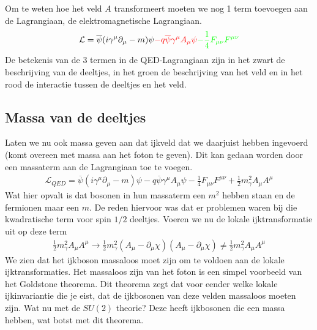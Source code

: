 \documentclass[../main.tex]{subfiles}
\begin{document}
Om te weten hoe het veld $A$ transformeert moeten we nog 1 term toevoegen aan de Lagrangiaan, de elektromagnetische Lagrangiaan.
\begin{equation}
    \begin{aligned}
        \label{eq:lok_ijk_inv_qed}
        \mathcal{L} = \overline \psi (i\gamma^\mu \partial_\mu - m)\psi {\color{red}- q\overline\psi\gamma^\mu A_\mu\psi} {\color{green}- \frac{1}{4} F_{\mu\nu}F^{\mu\nu}}
    \end{aligned}
\end{equation}
De betekenis van de 3 termen in de QED-Lagrangiaan zijn in het zwart de beschrijving van de deeltjes, in het groen de beschrijving van het veld en in het rood de interactie tussen de deeltjes en het veld.

\subsection{Massa van de deeltjes}%
\label{sub:massa_van_de_deeltjes}

Laten we nu ook massa geven aan dat ijkveld dat we daarjuist hebben ingevoerd (komt overeen met massa aan het foton te geven). Dit kan gedaan worden door een massaterm aan de Lagrangiaan toe te voegen.
\begin{equation}
    \begin{aligned}
        \label{eq:qed_lagr_met_massa}
        \mathcal{L}_{QED} = \overline \psi (i\gamma^\mu \partial_\mu - m)\psi - q\overline\psi\gamma^\mu A_\mu\psi - \frac{1}{4} F_{\mu\nu}F^{\mu\nu} + \frac{1}{2} m_\gamma^2 A_\mu A^\mu
    \end{aligned}
\end{equation}
Wat hier opvalt is dat bosonen in hun massaterm een $m^2$ hebben staan en de fermionen maar een $m$. De reden hiervoor was dat er problemen waren bij die kwadratische term voor spin $1/2$ deeltjes. Voeren we nu de lokale ijktransformatie uit op deze term
\begin{equation}
    \begin{aligned}
        \label{eq:lok_ijk_tran_massa_term}
        \frac{1}{2} m_\gamma^2A_\mu A^\mu \rightarrow \frac{1}{2} m_\gamma^2(A_\mu-\partial_\mu\chi)(A_\mu-\partial_\mu\chi) \neq \frac{1}{2} m_\gamma^2 A_\mu A^\mu
    \end{aligned}
\end{equation}
We zien dat het ijkboson massaloos moet zijn om te voldoen aan de lokale ijktransformaties. Het massaloos zijn van het foton is een simpel voorbeeld van het Goldstone theorema. Dit theorema zegt dat voor eender welke lokale ijkinvariantie die je eist, dat de ijkbosonen van deze velden massaloos moeten zijn. Wat nu met de $SU(2)$ theorie? Deze heeft ijkbosonen die een massa hebben, wat botst met dit theorema.
\end{document}
